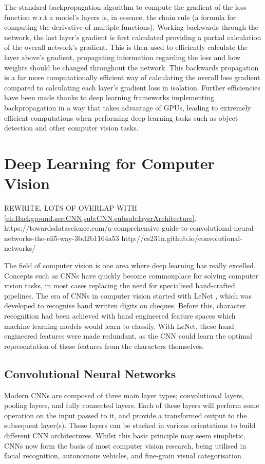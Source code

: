 The standard backpropagation algorithm to compute the gradient of the loss function w.r.t a model's layers is, in essence, the chain rule (a formula for computing the derivative of multiple functions). Working backwards through the network, the last layer's gradient is first calculated providing a partial calculation of the overall network's gradient. This is then used to efficiently calculate the layer above's gradient, propagating information regarding the loss and how weights should be changed throughout the network. This backwards propagation is a far more computationally efficient way of calculating the overall loss gradient compared to calculating each layer's gradient loss in isolation. Further efficiencies have been made thanks to deep learning frameworks implementing backpropagation in a way that takes advantage of GPUs, leading to extremely efficient computations when performing deep learning tasks such as object detection and other computer vision tasks.


\section{Deep Learning for Computer Vision}\label{ch:Background,sec:DLforCV}

REWRITE, LOTS OF OVERLAP WITH \ref{ch:Background,sec:CNN,sub:CNN,subsub:layerArchitecture}. https://towardsdatascience.com/a-comprehensive-guide-to-convolutional-neural-networks-the-eli5-way-3bd2b1164a53
http://cs231n.github.io/convolutional-networks/

The field of computer vision is one area where deep learning has really excelled. Concepts such as CNNs have quickly become commonplace for solving computer vision tasks, in most cases replacing the need for specialised hand-crafted pipelines. The era of CNNs in computer vision started with LeNet \cite{lecun_gradient-based_1998}, which was developed to recognise hand written digits on cheques. Before this, character recognition had been achieved with hand engineered feature spaces which machine learning models would learn to classify. With LeNet, these hand engineered features were made redundant, as the CNN could learn the optimal representation of these features from the characters themselves. 

\subsection{Convolutional Neural Networks}\label{ch:Background,sec:CNN,sub:CNN}
Modern CNNs are composed of three main layer types; convolutional layers, pooling layers, and fully connected layers. Each of these layers will perform some operation on the input passed to it, and provide a transformed output to the subsequent layer(s). These layers can be stacked in various orientations to build different CNN architectures. Whilst this basic principle may seem simplistic, CNNs now form the basis of most computer vision research, being utilised in facial recognition, autonomous vehicles, and fine-grain visual categorisation. 

